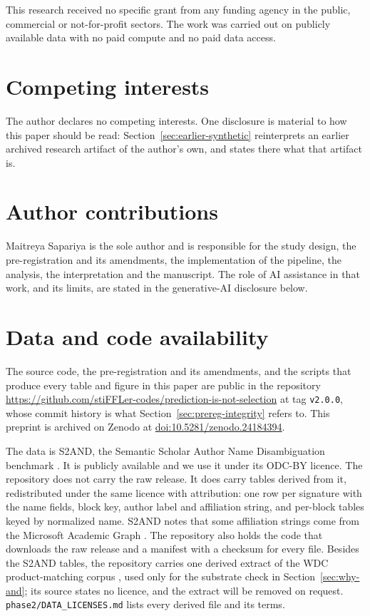 \documentclass[11pt]{article}
\begin{document}
This research received no specific grant from any funding agency in the
public, commercial or not-for-profit sectors. The work was carried out on
publicly available data with no paid compute and no paid data access.

\section*{Competing interests}

The author declares no competing interests. One disclosure is material to how
this paper should be read: Section~\ref{sec:earlier-synthetic} reinterprets an
earlier archived research artifact of the author's own, and states there what
that artifact is.

\section*{Author contributions}

Maitreya Sapariya is the sole author and is responsible for the study design,
the pre-registration and its amendments, the implementation of the pipeline,
the analysis, the interpretation and the manuscript. The role of AI assistance
in that work, and its limits, are stated in the generative-AI disclosure below.

\section*{Data and code availability}

The source code, the pre-registration and its amendments, and the scripts
that produce every table and figure in this paper are public in the
repository \url{https://github.com/stiFFLer-codes/prediction-is-not-selection}
at tag \texttt{v2.0.0}, whose commit history is what
Section~\ref{sec:prereg-integrity} refers to. This preprint is archived on
Zenodo at \href{https://doi.org/10.5281/zenodo.24184394}{doi:10.5281/zenodo.24184394}.

The data is S2AND, the Semantic Scholar Author Name Disambiguation benchmark
\citep{s2and2021}. It is publicly available and we use it under its ODC-BY
licence. The repository does not carry the raw release. It does carry tables
derived from it, redistributed under the same licence with attribution: one
row per signature with the name fields, block key, author label and
affiliation string, and per-block tables keyed by normalized name. S2AND notes
that some affiliation strings come from the Microsoft Academic Graph
\citep{sinha2015mas}. The repository also holds the code that downloads the
raw release and a manifest with a checksum for every file. Besides the S2AND
tables, the repository carries one derived extract of the WDC
product-matching corpus \citep{primpeli2019wdc}, used only for the substrate
check in Section~\ref{sec:why-and}; its source states no licence, and the
extract will be removed on request. \texttt{phase2/DATA\_LICENSES.md} lists
every derived file and its terms.
\end{document}
